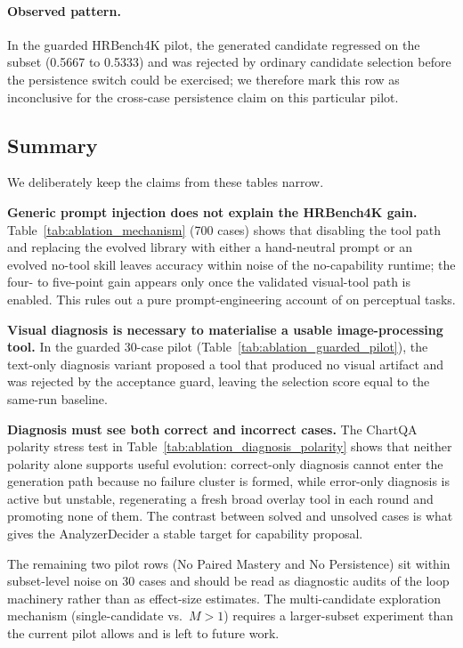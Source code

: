 \paragraph{Observed pattern.}
In the guarded HRBench4K pilot, the generated candidate regressed on the subset
(0.5667 to 0.5333) and was rejected by ordinary candidate selection before the
persistence switch could be exercised; we therefore mark this row as inconclusive for the
cross-case persistence claim on this particular pilot.

\subsection{Summary}
\label{app:abl_summary}

We deliberately keep the claims from these tables narrow.

\textbf{Generic prompt injection does not explain the HRBench4K gain.}
Table~\ref{tab:ablation_mechanism} (700 cases) shows that disabling the tool path and
replacing the evolved library with either a hand-neutral prompt or an evolved no-tool
skill leaves accuracy within noise of the no-capability runtime; the four- to five-point
gain appears only once the validated visual-tool path is enabled. This rules out a pure
prompt-engineering account of \sysname{} on perceptual tasks.

\textbf{Visual diagnosis is necessary to materialise a usable image-processing tool.}
In the guarded 30-case pilot (Table~\ref{tab:ablation_guarded_pilot}), the text-only
diagnosis variant proposed a tool that produced no visual artifact and was rejected by
the acceptance guard, leaving the selection score equal to the same-run baseline.

\textbf{Diagnosis must see both correct and incorrect cases.}
The ChartQA polarity stress test in Table~\ref{tab:ablation_diagnosis_polarity} shows that
neither polarity alone supports useful evolution: correct-only diagnosis cannot enter the
generation path because no failure cluster is formed, while error-only diagnosis is
active but unstable, regenerating a fresh broad overlay tool in each round and promoting
none of them. The contrast between solved and unsolved cases is what gives the
AnalyzerDecider a stable target for capability proposal.

The remaining two pilot rows (No Paired Mastery and No Persistence) sit within
subset-level noise on 30 cases and should be read as diagnostic audits of the loop
machinery rather than as effect-size estimates. The multi-candidate exploration
mechanism (single-candidate vs.\ $M{>}1$) requires a larger-subset experiment than the
current pilot allows and is left to future work.

